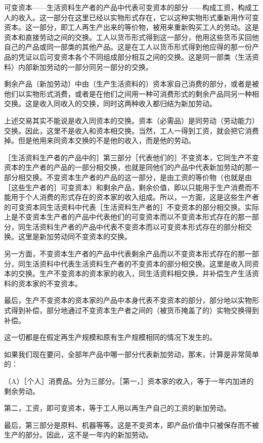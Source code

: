 可变资本——生活资料生产者的产品中代表可变资本的部分——构成工资，构成工人的收入。这一部分在这里已经以实物形式存在，它以这种实物形式重新用作可变资本。这一部分，即工人再生产出来的等价物，被用来重新购买工人的劳动。这是资本和直接劳动之间的交换。工人以货币形式得到这一部分，他用这些货币买回他自己的产品或同一部类的其他产品。这是在工人以货币形式得到他应得的那一份产品的凭证以后可变资本各个不同组成部分相互之间的交换。这是同一部类（生活资料）内部新加劳动的一部分同另一部分的交换。

剩余产品（新加劳动）中由（生产生活资料的）资本家自己消费的部分，或者是被他们以实物形式消费，或者是在他们之间用一种可消费形式的剩余产品同另一种相交换。这是收入同收入的交换，同时这两种收入都归结为新加劳动。

上述交易其实不能说是收入同资本的交换。资本（必需品）是同劳动（劳动能力）交换。因此，这里不是收入和资本相交换。当然，工人一得到工资，就会把它消费掉。但是他用来同资本交换的不是他的收入，而是他的劳动。

［生活资料生产者的产品中的］第三部分［代表他们的］不变资本，它同生产不变资本的生产者的产品的一部分相交换，也就是同他们的产品中代表新加劳动的那一部分相交换。不变资本生产者的产品的这一部分，是由工资的等价物（也就是由［这些生产者的］可变资本）和剩余产品，剩余价值，即以只能用于生产消费而不能用于个人消费的形式存在的资本家的收入组成。所以，一方面，这是这些生产者的可变资本同生活资料中代表［生活资料生产者的］不变资本的部分相交换。实际上是不变资本生产者的产品中代表他们的可变资本而以不变资本形式存在的那一部分，同生活资料生产者的产品中代表不变资本而以可变资本形式存在的部分相交换。这里是新加劳动同不变资本的交换。

另一方面，不变资本生产者的产品中代表剩余产品而以不变资本形式存在的那一部分，同生活资料中代表生活资料生产者的不变资本的部分相交换。这里是收入同资本的交换。生产不变资本的资本家的收入，同生活资料相交换，并补偿生产生活资料的资本家的不变资本。

最后，生产不变资本的资本家的产品中本身代表不变资本的部分，部分地以实物形式得到补偿，部分地通过不变资本生产者之间的（被货币掩盖了的）实物交换得到补偿。

这一切都是在假定再生产规模和原有生产规模相同的情况下发生的。

如果我们现在要问，全部年产品中哪一部分代表新加劳动，那末，计算是非常简单的：

（A）［个人］消费品。分为三部分。［第一，］资本家的收入，等于一年内加进的剩余劳动。

第二，工资，即可变资本，等于工人用以再生产自己的工资的新加劳动。

最后，第三部分是原料、机器等等。这是不变资本，即产品价值中只被保存而不被生产的部分。因此，这不是一年内的新加劳动。

